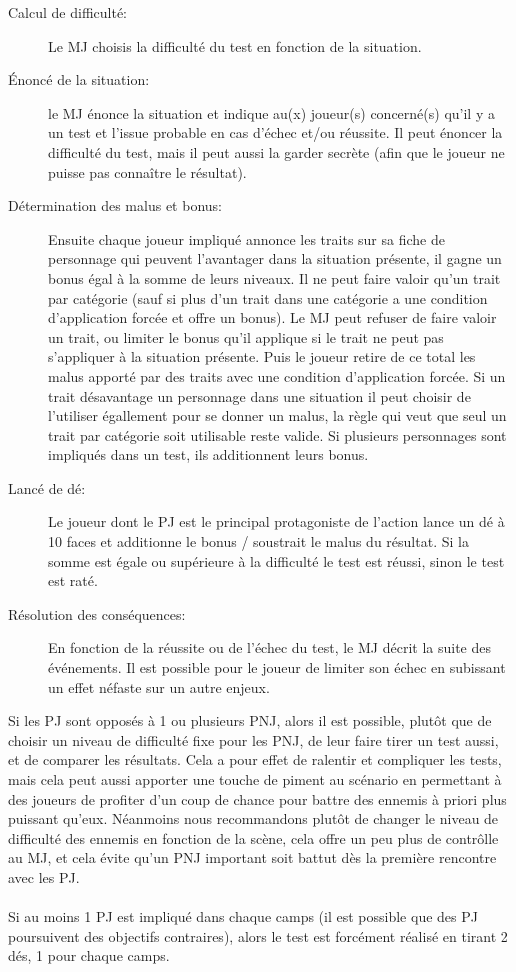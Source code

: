 \documentclass[a4paper,10pt,twoside,twocolumn]{article}
\begin{document}
 \begin{description}
  \item[Calcul de difficulté:] Le MJ choisis la difficulté du test en fonction de la situation.
  \item[Énoncé de la situation:] le MJ énonce la situation et indique au(x) joueur(s) concerné(s) qu'il y a un test et l'issue probable en cas d'échec et/ou réussite. Il peut énoncer la difficulté du test, mais il peut aussi la garder secrète (afin que le joueur ne puisse pas connaître le résultat).
  \item[Détermination des malus et bonus:] Ensuite chaque joueur impliqué annonce les traits sur sa fiche de personnage qui peuvent l'avantager dans la situation présente, il gagne un bonus égal à la somme de leurs niveaux. Il ne peut faire valoir qu'un trait par catégorie (sauf si plus d'un trait dans une catégorie a une condition d'application forcée et offre un bonus). Le MJ peut refuser de faire valoir un trait, ou limiter le bonus qu'il applique si le trait ne peut pas s'appliquer à la situation présente. Puis le joueur retire de ce total les malus apporté par des traits avec une condition d'application forcée. Si un trait désavantage un personnage dans une situation il peut choisir de l'utiliser égallement pour se donner un malus, la règle qui veut que seul un trait par catégorie soit utilisable reste valide. Si plusieurs personnages sont impliqués dans un test, ils additionnent leurs bonus.
  \item[Lancé de dé:] Le joueur dont le PJ est le principal protagoniste de l'action lance un dé à 10 faces et additionne le bonus / soustrait le malus du résultat. Si la somme est égale ou supérieure à la difficulté le test est réussi, sinon le test est raté.
  \item[Résolution des conséquences:] En fonction de la réussite ou de l'échec du test, le MJ décrit la suite des événements. Il est possible pour le joueur de limiter son échec en subissant un effet néfaste sur un autre enjeux.
 \end{description}
 
 Si les PJ sont opposés à 1 ou plusieurs PNJ, alors il est possible, plutôt que de choisir un niveau de difficulté fixe pour les PNJ, de leur faire tirer un test aussi, et de comparer les résultats. Cela a pour effet de ralentir et compliquer les tests, mais cela peut aussi apporter une touche de piment au scénario en permettant à des joueurs de profiter d'un coup de chance pour battre des ennemis à priori plus puissant qu'eux. Néanmoins nous recommandons plutôt de changer le niveau de difficulté des ennemis en fonction de la scène, cela offre un peu plus de contrôlle au MJ, et cela évite qu'un PNJ important soit battut dès la première rencontre avec les PJ.\\
 \\
 Si au moins 1 PJ est impliqué dans chaque camps (il est possible que des PJ poursuivent des objectifs contraires), alors le test est forcément réalisé en tirant 2 dés, 1 pour chaque camps.
\end{document}
